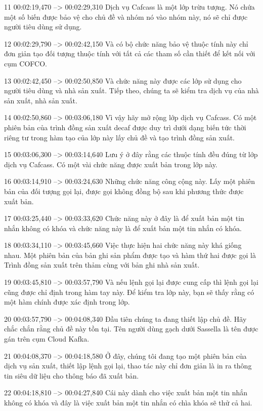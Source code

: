 11
00:02:19,470 --> 00:02:29,310
Dịch vụ Cafcass là một lớp trừu tượng.  Nó chứa một số biến được bảo vệ cho chủ đề và nhóm nó vào nhóm này, nó sẽ chỉ được người tiêu dùng sử dụng.

12
00:02:29,790 --> 00:02:42,150
Và có bộ chức năng bảo vệ thuộc tính này chỉ đơn giản tạo đối tượng thuộc tính với tất cả các tham số cần thiết để kết nối với cụm COFCO.

13
00:02:42,450 --> 00:02:50,850
Và chức năng này được các lớp sử dụng cho người tiêu dùng và nhà sản xuất.  Tiếp theo, chúng ta sẽ kiểm tra dịch vụ của nhà sản xuất, nhà sản xuất.

14
00:02:50,860 --> 00:03:06,180
Vì vậy hãy mở rộng lớp dịch vụ Cafcass.  Có một phiên bản của trình đồng sản xuất decaf được duy trì dưới dạng biến tức thời riêng tư trong hàm tạo của lớp này lấy chủ đề và tạo trình đồng sản xuất.

15
00:03:06,300 --> 00:03:14,640
Lưu ý ở đây rằng các thuộc tính đều đúng từ lớp dịch vụ Cafcass.  Có một vài chức năng được xuất bản trong lớp này.

16
00:03:14,910 --> 00:03:24,630
Những chức năng công cộng này.  Lấy một phiên bản của đối tượng gọi lại, được gọi không đồng bộ sau khi phương thức được xuất bản.

17
00:03:25,440 --> 00:03:33,620
Chức năng này ở đây là để xuất bản một tin nhắn không có khóa và chức năng này là để xuất bản một tin nhắn có khóa.

18
00:03:34,110 --> 00:03:45,660
Việc thực hiện hai chức năng này khá giống nhau.  Một phiên bản của bản ghi sản phẩm được tạo và hàm thứ hai được gọi là Trình đồng sản xuất trên thảm cùng với bản ghi nhà sản xuất.

19
00:03:45,810 --> 00:03:57,790
Và nếu lệnh gọi lại được cung cấp thì lệnh gọi lại cũng được chỉ định trong hàm tay này.  Để kiểm tra lớp này, bạn sẽ thấy rằng có một hàm chính được xác định trong lớp.

20
00:03:57,790 --> 00:04:08,340
Đầu tiên chúng ta đang thiết lập chủ đề.  Hãy chắc chắn rằng chủ đề này tồn tại.  Tên người dùng gạch dưới Sassella là tên được gán trên cụm Cloud Kafka.

21
00:04:08,370 --> 00:04:18,580
Ở đây, chúng tôi đang tạo một phiên bản của dịch vụ sản xuất, thiết lập lệnh gọi lại, thao tác này chỉ đơn giản là in ra thông tin siêu dữ liệu cho thông báo đã xuất bản.

22
00:04:18,810 --> 00:04:27,840
Cái này dành cho việc xuất bản một tin nhắn không có khóa và đây là việc xuất bản một tin nhắn có chìa khóa sẽ thử cả hai.

